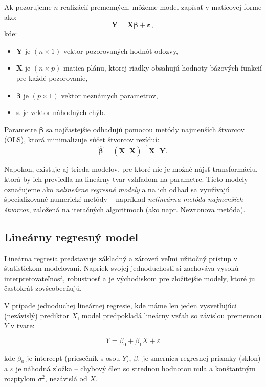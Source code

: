 Ak pozorujeme $n$ realizácií premenných, môžeme model zapísať v maticovej forme ako:
\begin{equation}
\mathbf{Y} = \mathbf{X} \boldsymbol{\beta} + \boldsymbol{\varepsilon},
\end{equation}
kde:
\begin{itemize}
  \item $\mathbf{Y}$ je $(n \times 1)$ vektor pozorovaných hodnôt odozvy,
  \item $\mathbf{X}$ je $(n \times p)$ matica plánu, ktorej riadky obsahujú hodnoty bázových funkcií pre každé pozorovanie,
  \item $\boldsymbol{\beta}$ je $(p \times 1)$ vektor neznámych parametrov,
  \item $\boldsymbol{\varepsilon}$ je vektor náhodných chýb.
\end{itemize}
Parametre $\boldsymbol{\beta}$ sa najčastejšie odhadujú pomocou metódy najmenších štvorcov (OLS), ktorá minimalizuje súčet štvorcov rezíduí:
\[
\hat{\boldsymbol{\beta}} = (\mathbf{X}^\top \mathbf{X})^{-1} \mathbf{X}^\top \mathbf{Y}.
\]

\smallskip
\noindent
Napokon, existuje aj trieda modelov, pre ktoré nie je možné nájsť transformáciu, ktorá by ich previedla na lineárny tvar vzhľadom na parametre. Tieto modely označujeme ako \textit{nelineárne regresné modely} a na ich odhad sa využívajú špecializované numerické metódy – napríklad \textit{nelineárna metóda najmenších štvorcov}, založená na iteračných algoritmoch (ako napr. Newtonova metóda).

\subsection{Lineárny regresný model}
\label{subsec:linear_regression}

Lineárna regresia predstavuje základný a zároveň veľmi užitočný prístup v štatistickom modelovaní. Napriek svojej jednoduchosti si zachováva vysokú interpretovateľnosť, robustnosť a je východiskom pre zložitejšie modely, ktoré ju častokrát zovšeobecňujú.

V prípade jednoduchej lineárnej regresie, kde máme len jeden vysvetľujúci (nezávislý) prediktor $X$, model predpokladá lineárny vzťah so závislou premennou $Y$ v tvare:

\begin{equation}
Y = \beta_0 + \beta_1 X + \varepsilon
\end{equation}

kde $\beta_0$ je intercept (priesečník s osou $Y$), $\beta_1$ je smernica regresnej priamky (sklon) a $\varepsilon$ je náhodná zložka – chybový člen so strednou hodnotou nula a konštantným rozptylom $\sigma^2$, nezávislá od $X$.

